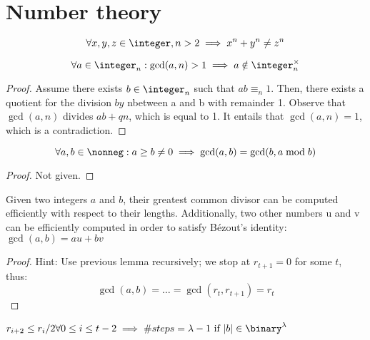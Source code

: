 
\section{Number theory}

\begin{theorem}
    \[
        \forall x, y, z \in \integer, n > 2 \implies x^n + y^n \neq z^n
    \]
\end{theorem}

\begin{lemma}
    \[
        \forall a \in \integer_n : \gcd(a, n) > 1 \implies a \notin \integer_n^\times
    \]
\end{lemma}

\begin{proof}
    Assume there exists $b \in \integer_n$ such that $ab \equiv_n 1$. Then, there exists a quotient for the division $by$ nbetween a and b with remainder 1. Observe that $\gcd(a, n)$ divides $ab + qn$, which is equal to 1. It entails that $\gcd(a, n) = 1$, which is a contradiction.
\end{proof}

\begin{lemma}
    \[
        \forall a, b \in \nonneg : a \geq b \neq 0 \implies \gcd(a, b) = \gcd(b, a \mod b)
    \]
\end{lemma}

\begin{proof}
    Not given.
\end{proof}

\begin{theorem}
    Given two integers $a$ and $b$, their greatest common divisor can be computed efficiently with respect to their lengths. Additionally, two other numbers u and v can be efficiently computed in order to satisfy B\'ezout's identity: $\gcd(a, b) = au + bv$
\end{theorem}

\begin{proof}
    Hint: Use previous lemma recursively; we stop at $r_{t + 1} = 0$ for some $t$, thus:
    \[
        \gcd(a, b) = \dots = \gcd(r_t, r_{t + 1}) = r_t
    \]
\end{proof}

\begin{claim}
    $r_{i + 2} \leq r_i/2 \forall 0 \leq i \leq t - 2 \implies \#steps = \lambda - 1 \text{ if } |b| \in \binary^\lambda$
\end{claim}

